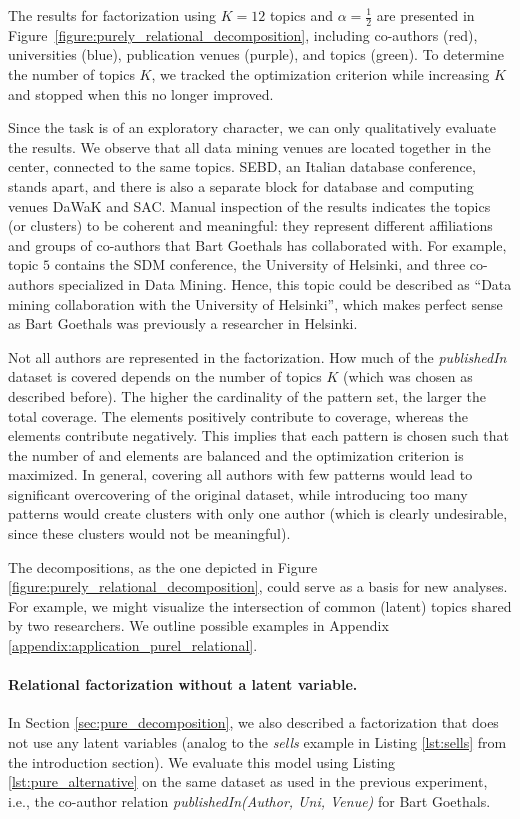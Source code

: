 The results for factorization using $K = 12$ topics and $\alpha=\frac{1}{2}$ are presented in Figure~\ref{figure:purely_relational_decomposition}, including co-authors (red), universities (blue), publication venues (purple), and topics (green). To determine the number of topics $K$, we tracked the optimization criterion while increasing $K$ and stopped when this no longer improved.

Since the task is of an exploratory character, we can only qualitatively evaluate the results. We observe that all data mining venues are located together in the center, connected to the same topics. SEBD, an Italian database conference, stands apart, and there is also a separate block for database and computing venues DaWaK and SAC. \changesb Manual inspection of the results indicates the topics (or clusters) to be coherent and meaningful: they represent different affiliations and groups of co-authors that Bart Goethals has collaborated with. For example, topic $5$ contains the SDM conference, the University of Helsinki, and three co-authors specialized in Data Mining. Hence, this topic could be described as ``Data mining collaboration with the University of Helsinki'', which makes perfect sense as Bart Goethals was previously a researcher in Helsinki. \changese

Not all authors are represented in the factorization. How much of the \textit{publishedIn} dataset is covered depends on the number of topics $K$ (which was chosen as described before). The higher the cardinality of the pattern set, the larger the total coverage. The \covered elements positively contribute to coverage, whereas the \overcovered elements contribute negatively. This implies that each pattern is chosen such that the number of \covered and \overcovered elements are balanced and the optimization criterion is maximized. In general, covering all authors with few patterns would lead to significant overcovering of the original dataset, while introducing too many patterns would create clusters with only one author (which is clearly undesirable, since these clusters would not be meaningful). 

\changesb The decompositions, as the one depicted in Figure \ref{figure:purely_relational_decomposition}, could serve as a basis for new analyses. For example, we might visualize the intersection of common (latent) topics shared by two researchers. We outline possible examples in Appendix \ref{appendix:application_purel_relational}. \changese


\paragraph{Relational factorization without a latent variable.} In Section \ref{sec:pure_decomposition}, we also described a factorization that does not use any latent variables (analog to the \emph{sells} example in Listing \ref{lst:sells} from the introduction section). We evaluate this model using Listing \ref{lst:pure_alternative} on the same dataset as used in the previous experiment, i.e., the co-author relation \textit{publishedIn(Author, Uni, Venue)} for Bart Goethals.

